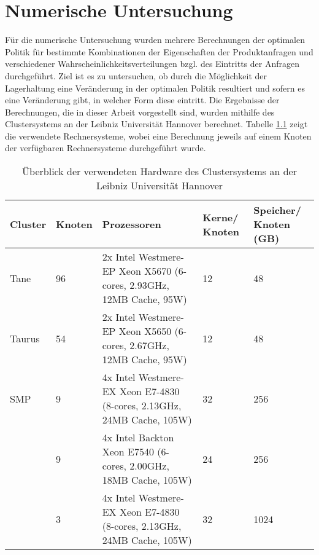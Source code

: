 \chapter{Numerische Untersuchung}
\setcounter{footnote}{4}  %

Für die numerische Untersuchung wurden mehrere Berechnungen der optimalen Politik für bestimmte Kombinationen der Eigenschaften der Produktanfragen und verschiedener Wahrscheinlichkeitsverteilungen bzgl. des Eintritts der Anfragen durchgeführt. Ziel ist es zu untersuchen, ob durch die Möglichkeit der Lagerhaltung eine Veränderung in der optimalen Politik resultiert und sofern es eine Veränderung gibt, in welcher Form diese eintritt. Die Ergebnisse der Berechnungen, die in dieser Arbeit vorgestellt sind, wurden mithilfe des Clustersystems an der Leibniz Universität Hannover berechnet. Tabelle \ref{Hardware} zeigt die verwendete Rechnersysteme, wobei eine Berechnung jeweils auf einem Knoten der verfügbaren Rechnersysteme durchgeführt wurde.

\begin{table}[h!]
\renewcommand{\arraystretch}{1.5}
  \begin{center}
  \begin{small}
    \caption{Überblick der verwendeten Hardware des Clustersystems an der Leibniz Universität Hannover}  \label{Hardware}
    \vspace*{3mm}
    \begin{tabular}{llp{6cm}p{1.5cm}p{1.5cm}}   %
     Cluster & Knoten  & Prozessoren & Kerne/ Knoten  & Speicher/ Knoten (GB) \\  \hline
  Tane   & 96 & 2x Intel Westmere-EP Xeon X5670 (6-cores, 2.93GHz, 12MB Cache, 95W)  & 12 & 48 \\
   Taurus  & 54 & 2x Intel Westmere-EP Xeon X5650 (6-cores, 2.67GHz, 12MB Cache, 95W)  & 12 &  48 \\
   SMP  & 9 &4x Intel Westmere-EX Xeon E7-4830 (8-cores, 2.13GHz, 24MB Cache, 105W)   & 32 & 256  \\
    & 9 & 4x Intel Backton Xeon E7540 (6-cores, 2.00GHz, 18MB Cache, 105W)   & 24 & 256 \\
      & 3 & 4x Intel Westmere-EX Xeon E7-4830 (8-cores, 2.13GHz, 24MB Cache, 105W)   & 32 & 1024  \\ \hline
    \end{tabular} \\[3mm]
    \end{small}
  \end{center}
\end{table}

